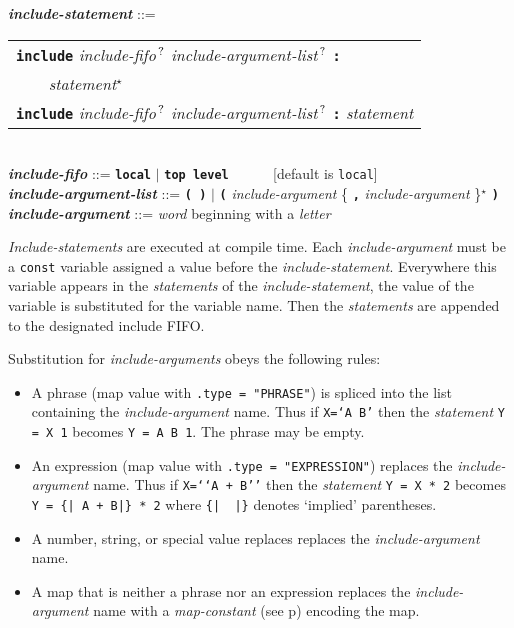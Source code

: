 \documentclass[12pt]{article}
\newcommand{\TT}[1]{{\tt \bfseries #1}}
\newcommand{\STAR}{{\Large $^\star$}}
\newcommand{\QMARK}{{$^{\,\mbox{\footnotesize ?}}$}}
\newcommand{\emkey}[1]{{\em \bfseries #1}}
\newcommand{\pagref}[1]{p\pageref{#1}}
\newenvironment{indpar}[1][0.3in]%
	{\begin{list}{}%
		     {\setlength{\itemsep}{0in}%
		      \setlength{\topsep}{0in}%
		      \setlength{\parsep}{1ex}%
		      \setlength{\labelwidth}{#1}%
		      \setlength{\leftmargin}{#1}%
		      \addtolength{\leftmargin}{\labelsep}}%
	 \item}%
	{\end{list}}
\begin{document}
\begin{indpar}
\emkey{include-statement}\label{INCLUDE-STATEMENT} ::=
    \begin{tabular}[t]{l}
    \TT{include} {\em include-fifo}\QMARK{}
    	{\em include-argument-list}\QMARK{} \TT{:} \\
    \TT{~~~~}{\em statement}\STAR{} \\
    \TT{include}  {\em include-fifo}\QMARK{}
    	{\em include-argument-list}\QMARK{} \TT{:}
	{\em statement} \\
    \end{tabular}
\\[0.5ex]
\emkey{include-fifo} ::= \TT{local} $|$ \TT{top level}
	~~~~~ [default is {\tt local}]
\\[0.5ex]
\emkey{include-argument-list} ::= \TT{( )} $|$
	\TT{(} {\em include-argument}
	\{ \TT{,} {\em include-argument} \}\STAR{} \TT{)}
\\[0.5ex]
\emkey{include-argument} ::= {\em word} beginning with a {\em letter}

\end{indpar}

{\em Include-statements} are executed at compile time.
Each {\em include-argument} must be a {\tt const} variable assigned
a value before the {\em include-statement}.  Everywhere this variable
appears in the {\em statements} of the {\em include-statement},
the value of the variable is substituted for the variable name.
Then the {\em statements} are appended to the designated include FIFO.

Substitution for {\em include-arguments} obeys the following rules:
\begin{itemize}
\item A phrase (map value with {\tt .type = "PHRASE"}) is spliced
into the list containing the {\em include-argument} name.  Thus
if {\tt X=`A B'} then the {\em statement} {\tt Y = X 1} becomes
{\tt Y = A B 1}.  The phrase may be empty.

\item An expression (map value with {\tt .type = "EXPRESSION"})
replaces the {\em include-argument} name.  Thus
if {\tt X=`{}`A + B'{}'} then the {\em statement} {\tt Y = X * 2} becomes
{\tt Y = \{| A + B|\} * 2} where {\tt \{|~~|\}} denotes `implied'
parentheses.

\item A number, string, or special value replaces
replaces the {\em include-argument} name.

\item A map that is neither a phrase nor an expression replaces the
{\em include-argument} name with a {\em map-constant}
(see \pagref{MAP-CONSTANT}) encoding the map.
\end{itemize}
\end{document}
